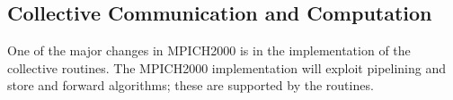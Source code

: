 \documentclass{article}
\begin{document}
\subsubsection{}
\subsubsection{}
\subsubsection{}
\subsubsection{}
\subsubsection{}
\subsubsection{}
\subsubsection{}
\subsubsection{}
\subsubsection{}
\subsubsection{}
\subsubsection{}
\subsubsection{}

\subsection{Collective Communication and Computation}
One of the major changes in MPICH2000 is in the implementation of the
collective routines.  The MPICH2000 implementation will exploit
pipelining and store and forward algorithms; these are supported by
the  routines.  
\end{document}
